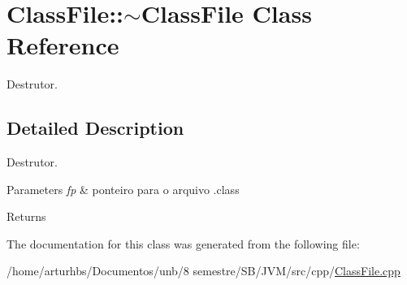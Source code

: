 \hypertarget{classClassFile_1_1~ClassFile}{}\section{Class\+File\+:\+:$\sim$\+Class\+File Class Reference}
\label{classClassFile_1_1~ClassFile}


Destrutor.  




\subsection{Detailed Description}
Destrutor. 


\begin{DoxyParams}{Parameters}
{\em fp} & ponteiro para o arquivo .class \\
\hline
\end{DoxyParams}
\begin{DoxyReturn}{Returns}

\end{DoxyReturn}


The documentation for this class was generated from the following file\+:\begin{DoxyCompactItemize}
\item 
/home/arturhbs/\+Documentos/unb/8 semestre/\+S\+B/\+J\+V\+M/src/cpp/\hyperlink{ClassFile_8cpp}{Class\+File.\+cpp}\end{DoxyCompactItemize}
